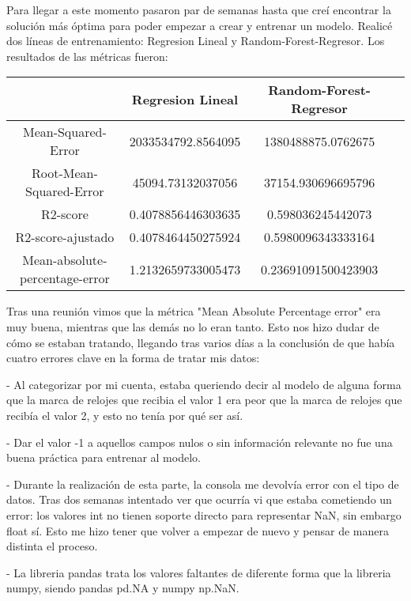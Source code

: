 	Para llegar a este momento pasaron par de semanas hasta que creí encontrar la solución más óptima para poder empezar a crear y entrenar un modelo. Realicé dos líneas de entrenamiento: Regresion Lineal y Random-Forest-Regresor. Los resultados de las métricas fueron:
	
	\begin{tabular}{|c|c|c|c|}
  		\hline
  		  & Regresion Lineal & Random-Forest-Regresor \\
  		\hline
  		Mean-Squared-Error & 2033534792.8564095 & 1380488875.0762675 \\
  		\hline
  		Root-Mean-Squared-Error & 45094.73132037056 & 37154.930696695796 \\
  		\hline
  		R2-score & 0.4078856446303635 & 0.598036245442073 \\
  		\hline
  		R2-score-ajustado & 0.4078464450275924 & 0.5980096343333164 \\
  		\hline
  		Mean-absolute-percentage-error & 1.2132659733005473 & 0.23691091500423903 \\
  		\hline
	\end{tabular}
	
	Tras una reunión vimos que la métrica "Mean Absolute Percentage error" era muy buena, mientras que las demás no lo eran tanto. Esto nos hizo dudar de cómo se estaban tratando, llegando tras varios días a la conclusión de que había cuatro errores clave en la forma de tratar mis datos:
	
	\begin{description}
		\item - Al categorizar por mi cuenta, estaba queriendo decir al modelo de alguna forma que la marca de relojes que recibia el valor 1 era peor que la marca de relojes que recibía el valor 2, y esto no tenía por qué ser así.
		\item - Dar el valor -1 a aquellos campos nulos o sin información relevante no fue una buena práctica para entrenar al modelo.
		\item - Durante la realización de esta parte, la consola me devolvía error con el tipo de datos. Tras dos semanas intentado ver que ocurría vi que estaba cometiendo un error: los valores int no tienen soporte directo para representar NaN, sin embargo float sí. Esto me hizo tener que volver a empezar de nuevo y pensar de manera distinta el proceso.
		\item - La libreria pandas trata los valores faltantes de diferente forma que la libreria numpy, siendo pandas pd.NA y numpy np.NaN.
	\end{description}
	
